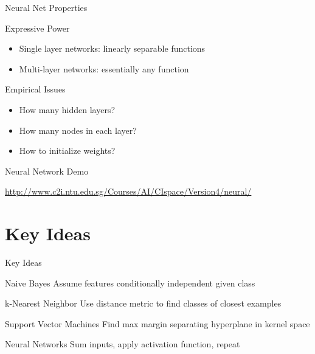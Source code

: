 \documentclass[12pt]{beamer}
\begin{document}
\begin{frame}[<+->]{Neural Net Properties}
	\begin{block}{Expressive Power}
		\begin{itemize}
			\item Single layer networks: linearly separable functions
			\item Multi-layer networks: essentially any function
		\end{itemize}
	\end{block}
	\begin{block}{Empirical Issues}
		\begin{itemize}
			\item How many hidden layers?
			\item How many nodes in each layer?
			\item How to initialize weights?
		\end{itemize}
	\end{block}
\end{frame}
\begin{frame}[fragile]{Neural Network Demo}
	\begin{center}
		\url{http://www.c2i.ntu.edu.sg/Courses/AI/CIspace/Version4/neural/}
	\end{center}
\end{frame}


\part{Key Ideas}
\begin{frame}{Key Ideas}
	\begin{block}{Naive Bayes}
		Assume features conditionally independent given class
	\end{block}
	\begin{block}{k-Nearest Neighbor}
		Use distance metric to find classes of closest examples
	\end{block}
	\begin{block}{Support Vector Machines}
		Find max margin separating hyperplane in kernel space
	\end{block}
	\begin{block}{Neural Networks}
		Sum inputs, apply activation function, repeat
	\end{block}
\end{frame}
\end{document}
